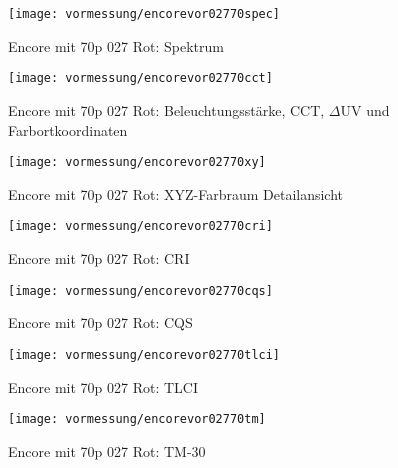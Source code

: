 \documentclass[pagesize,paper=A4,fontsize=12pt,utf8,numbers=noenddot,bibliography=totoc,listof=totoc,DIV=11,BCOR=1mm]{scrreprt}
\begin{document}
\begin{figure}[htp]     %
\centering
\texttt{[image: vormessung/encorevor02770spec]} 
\caption {Encore mit 70p 027 Rot: Spektrum} 
\end{figure}

\begin{figure}[htp]     %
\centering
\texttt{[image: vormessung/encorevor02770cct]} 
\caption {Encore mit 70p 027 Rot: Beleuchtungsstärke, CCT, $\Delta$UV und Farbortkoordinaten} 
\end{figure}

\begin{figure}[htp]     %
\centering
\texttt{[image: vormessung/encorevor02770xy]} 
\caption {Encore mit 70p 027 Rot: XYZ-Farbraum Detailansicht} 
\end{figure}

\begin{figure}[htp]     %
\centering
\texttt{[image: vormessung/encorevor02770cri]} 
\caption {Encore mit 70p 027 Rot: CRI} 
\end{figure}

\begin{figure}[htp]     %
\centering
\texttt{[image: vormessung/encorevor02770cqs]} 
\caption {Encore mit 70p 027 Rot: CQS} 
\end{figure}

\begin{figure}[htp]     %
\centering
\texttt{[image: vormessung/encorevor02770tlci]} 
\caption {Encore mit 70p 027 Rot: TLCI} 
\end{figure}

\begin{figure}[htp]     %
\centering
\texttt{[image: vormessung/encorevor02770tm]} 
\caption {Encore mit 70p 027 Rot: TM-30} 
\end{figure}
\end{document}
